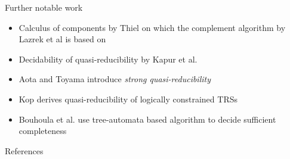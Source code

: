 \documentclass[onlytextwidth]{beamer}
\begin{document}
\begin{frame}{Further notable work}
    \begin{itemize}
        \item Calculus of components by Thiel on which the complement algorithm by Lazrek et al is based on
        \item Decidability of quasi-reducibility by Kapur et al.
        \item Aota and Toyama introduce \textit{strong quasi-reducibility} 
        \item Kop derives quasi-reducibility of logically constrained TRSs
        \item Bouhoula et al. use tree-automata based algorithm to decide sufficient completeness
    \end{itemize}
\end{frame}

\begin{frame}[allowframebreaks]{References}
\nocite{*}
\renewcommand*{\bibfont}{\scriptsize}
\printbibliography
\end{frame}
\end{document}
